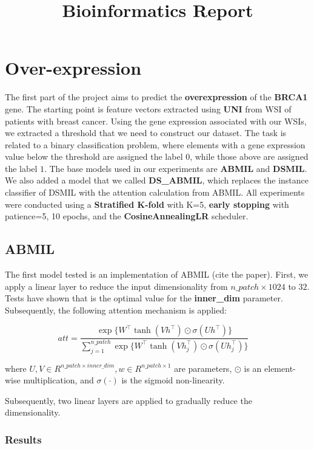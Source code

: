 \documentclass{article}
\title{Bioinformatics Report}
\begin{document}
\maketitle

\section{Over-expression} %
The first part of the project aims to predict the \textbf{overexpression} of the \textbf{BRCA1} gene. The starting point is feature vectors extracted using \textbf{UNI} from WSI of patients with breast cancer. Using the gene expression associated with our WSIs, we extracted a threshold that we need to construct our dataset. The task is related to a binary classification problem, where elements with a gene expression value below the threshold are assigned the label $0$, while those above are assigned the label $1$. The base models used in our experiments are \textbf{ABMIL} and \textbf{DSMIL}. We also added a model that we called \textbf{DS\_ABMIL}, which replaces the instance classifier of DSMIL with the attention calculation from ABMIL.
All experiments were conducted using a \textbf{Stratified K-fold} with K=5, \textbf{early stopping} with patience=5, 10 epochs, and the \textbf{CosineAnnealingLR} scheduler.

\subsection{ABMIL}
The first model tested is an implementation of ABMIL (cite the paper). First, we apply a linear layer to reduce the input dimensionality from $n\_patch \times 1024$ to $32$. Tests have shown that  is the optimal value for the  \textbf{inner\_dim} parameter. Subsequently, the following attention mechanism is applied:

\begin{equation}
	att = \frac{\exp\{W^\top \tanh(V h^\top) \odot \sigma(U h^\top)\}}{\sum_{j=1}^{n\_patch} \exp\{W^\top \tanh(V h_j^\top) \odot \sigma(U h_j^\top)\}} \quad
\end{equation}

where $U, V \in R^{ n\_patch \times inner\_dim}, w \in R^{n\_patch \times 1}$ are parameters, $\odot$ is an element-wise multiplication, and $\sigma(\cdot)$ is the sigmoid non-linearity.

Subsequently, two linear layers are applied to gradually reduce the dimensionality.
\subsubsection{Results}
\end{document}
